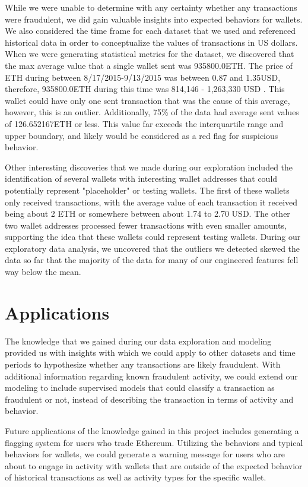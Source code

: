 \documentclass[sigconf]{acmart}
\begin{document}
While we were unable to determine with any certainty whether any transactions were fraudulent, we did gain valuable insights into expected behaviors for wallets. We also considered the time frame for each dataset that we used and referenced historical data in order to conceptualize the values of transactions in US dollars. When we were generating statistical metrics for the dataset, we discovered that the max average value that a single wallet sent was 935800.0ETH. The price of ETH during between 8/17/2015-9/13/2015 was between 0.87 and 1.35USD, therefore, 935800.0ETH during this time was 814,146 - 1,263,330 USD \cite{EthHistorical}. This wallet could have only one sent transaction that was the cause of this average, however, this is an outlier. Additionally, 75\% of the data had average sent values of 126.652167ETH or less. This value far exceeds the interquartile range and upper boundary, and likely would be considered as a red flag for suspicious behavior.  

Other interesting discoveries that we made during our exploration included the identification of several wallets with interesting wallet addresses that could potentially represent "placeholder" or testing wallets. The first of these wallets only received transactions, with the average value of each transaction it received being about 2 ETH or somewhere between about 1.74 to 2.70 USD. The other two wallet addresses processed fewer transactions with even smaller amounts, supporting the idea that these wallets could represent testing wallets. During our exploratory data analysis, we uncovered that the outliers we detected skewed the data so far that the majority of the data for many of our engineered features fell way below the mean. 


\section{Applications}
The knowledge that we gained during our data exploration and modeling provided us with insights with which we could apply to other datasets and time periods to hypothesize whether any transactions are likely fraudulent. With additional information regarding known fraudulent activity, we could extend our modeling to include supervised models that could classify a transaction as fraudulent or not, instead of describing the transaction in terms of activity and behavior. 

Future applications of the knowledge gained in this project includes generating a flagging system for users who trade Ethereum. Utilizing the behaviors and typical behaviors for wallets, we could generate a warning message for users who are about to engage in activity with wallets that are outside of the expected behavior of historical transactions as well as activity types for the specific wallet. 





 
\end{document}

